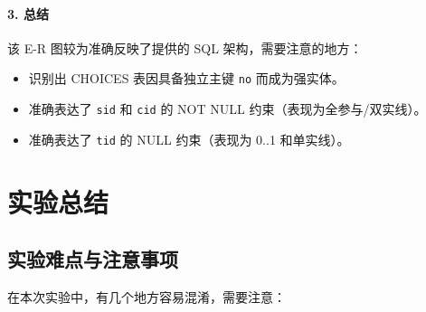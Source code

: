 \documentclass[a4paper]{article}
\begin{document}
\paragraph{3. 总结}
该 E-R 图较为准确反映了提供的 SQL 架构，需要注意的地方：
\begin{itemize}
    \item 识别出 CHOICES 表因具备独立主键 \texttt{no} 而成为强实体。
    \item 准确表达了 \texttt{sid} 和 \texttt{cid} 的 NOT NULL 约束（表现为全参与/双实线）。
    \item 准确表达了 \texttt{tid} 的 NULL 约束（表现为 0..1 和单实线）。
\end{itemize}

\section{实验总结}

\subsection{实验难点与注意事项}
在本次实验中，有几个地方容易混淆，需要注意：
\end{document}
